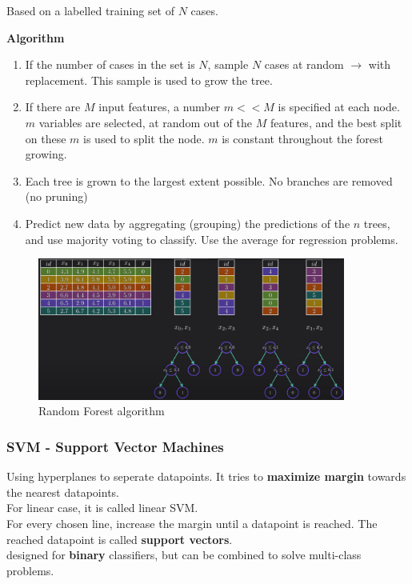 \documentclass[a4paper]{article}
\begin{document}
Based on a labelled training set of $ N $ cases.

\textbf{Algorithm} 
\begin{enumerate}
	\item If the number of cases in the set is $ N $, sample $ N $ cases at random $ \rightarrow $ with replacement. This sample is used to grow the tree. 
	\item If there are $ M $ input features, a number $ m << M $ is specified at each node. $ m $ variables are selected, at random out of the $ M $ features, and the best split on these $ m $ is used to split the node. $ m $ is constant throughout the forest growing. 
	\item Each tree is grown to the largest extent possible. No branches are removed (no pruning)
	\item Predict new data by aggregating (grouping) the predictions of the $ n $ trees, and use majority voting to classify. Use the average for regression problems.
\end{enumerate}


\begin{figure}[H]
\centering
\includegraphics[width=0.9\textwidth]{figures/Random_forest.png}
\caption{Random Forest algorithm}
\label{fig:random_forest}
\end{figure} 



\subsubsection{SVM - Support Vector Machines}
Using hyperplanes to seperate datapoints. It tries to \textbf{maximize margin} towards the nearest datapoints. \\
For linear case, it is called linear SVM. \\ 
For every chosen line, increase the margin until a datapoint is reached. The reached datapoint is called \textbf{support vectors}. \\
designed for \textbf{binary} classifiers, but can be combined to solve multi-class problems.  
\end{document}
